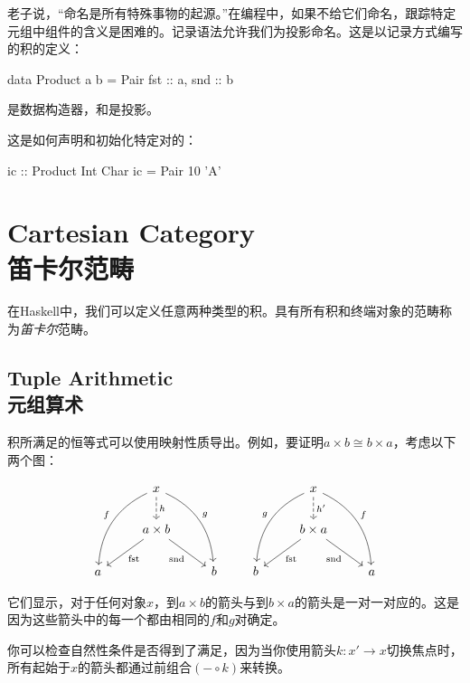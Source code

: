 \documentclass[DaoFP]{subfiles}
\begin{document}
 老子说，“命名是所有特殊事物的起源。”在编程中，如果不给它们命名，跟踪特定元组中组件的含义是困难的。记录语法允许我们为投影命名。这是以记录方式编写的积的定义：
 \begin{haskell}
  data Product a b = Pair { fst :: a, snd :: b }
 \end{haskell}
 是数据构造器，和是投影。

 这是如何声明和初始化特定对的：
 \begin{haskell}
  ic :: Product Int Char
  ic = Pair 10 'A'
 \end{haskell}

 \section{Cartesian Category\\笛卡尔范畴}

 在Haskell中，我们可以定义任意两种类型的积。具有所有积和终端对象的范畴称为\emph{笛卡尔}范畴。

 \subsection{Tuple Arithmetic\\元组算术}

 积所满足的恒等式可以使用映射性质导出。例如，要证明$a \times b \cong b \times a$，考虑以下两个图：

 \[
  \begin{tikzcd}
   &x
   \arrow[d, dashed, "h"]
   \arrow[ddl, bend right, "f"']
   \arrow[ddr, bend left, "g"]
   \\
   & a \times b
   \arrow[dl,  "\text{fst}"]
   \arrow[dr,   "\text{snd}"']
   \\
   a && b
  \end{tikzcd}
  \qquad
  \begin{tikzcd}
   &x
   \arrow[d, dashed, "h'"]
   \arrow[ddl, bend right, "g"']
   \arrow[ddr, bend left, "f"]
   \\
   & b \times a
   \arrow[dl,  "\text{fst}"]
   \arrow[dr,   "\text{snd}"']
   \\
   b && a
  \end{tikzcd}
 \]

 它们显示，对于任何对象$x$，到$a \times b$的箭头与到$b \times a$的箭头是一对一对应的。这是因为这些箭头中的每一个都由相同的$f$和$g$对确定。

 你可以检查自然性条件是否得到了满足，因为当你使用箭头$k \colon x' \to x$切换焦点时，所有起始于$x$的箭头都通过前组合$(- \circ k)$来转换。
\end{document}
